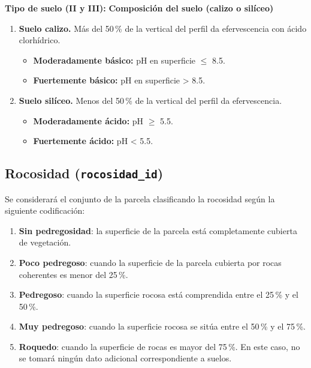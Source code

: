 \vspace{1em}
\noindent
\textbf{Tipo de suelo (II y III):} \textbf{Composición del suelo (calizo o silíceo)}

\begin{enumerate}
    \item \textbf{Suelo calizo.} Más del 50\,\% de la vertical del perfil da efervescencia con ácido clorhídrico.

          \begin{itemize}
              \item \textbf{Moderadamente básico:} pH en superficie $\leq$ 8.5.
              \item \textbf{Fuertemente básico:} pH en superficie > 8.5.
          \end{itemize}

    \item \textbf{Suelo silíceo.} Menos del 50\,\% de la vertical del perfil da efervescencia.

          \begin{itemize}
              \item \textbf{Moderadamente ácido:} pH $\geq$ 5.5.
              \item \textbf{Fuertemente ácido:} pH < 5.5.
          \end{itemize}
\end{enumerate}


\subsection{Rocosidad (\texttt{rocosidad\_id}) }\label{sec:Rocosid}
Se considerará el conjunto de la parcela clasificando la rocosidad según la siguiente codificación:
\begin{enumerate}
    \item \textbf{Sin pedregosidad}: la superficie de la parcela está completamente cubierta de vegetación.
    \item \textbf{Poco pedregoso}: cuando la superficie de la parcela cubierta por rocas coherentes es menor del 25\,\%.
    \item \textbf{Pedregoso}: cuando la superficie rocosa está comprendida entre el 25\,\% y el 50\,\%.
    \item \textbf{Muy pedregoso}: cuando la superficie rocosa se sitúa entre el 50\,\% y el 75\,\%.
    \item \textbf{Roquedo}: cuando la superficie de rocas es mayor del 75\,\%. En este caso, no se tomará ningún dato adicional correspondiente a suelos.
\end{enumerate}


